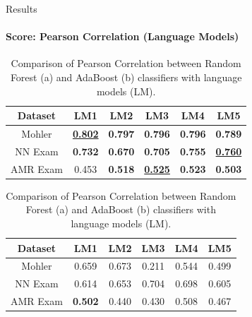 \documentclass[aspectratio=169]{beamer}
\begin{document}
\begin{frame}{Results}
\framesubtitle{Score: Pearson Correlation (Language Models)}
\noindent
\begin{table}
	\noindent
	\begin{subtable}[c]{0.7\textwidth}
		\noindent
		\centering
		\begin{tabular}{|c|c|c|c|c|c|}
			\hline
			Dataset & LM1 & LM2 & LM3 & LM4 & LM5 \\
			\hline
			Mohler &\underline{\textbf{0.802}}& \textbf{0.797}& \textbf{0.796}& \textbf{0.796}& \textbf{0.789}\\
			\hline
			NN Exam &\textbf{0.732}& \textbf{0.670}& \textbf{0.705}& \textbf{0.755}& \underline{\textbf{0.760}}\\
			\hline
			AMR Exam &0.453& \textbf{0.518}& \underline{\textbf{0.525}}& \textbf{0.523}& \textbf{0.503}\\
			\hline
		\end{tabular}
		\subcaption{}
	\end{subtable}
	\begin{subtable}[c]{0.7\textwidth}
		\centering
		\begin{tabular}{|c|c|c|c|c|c|}
			\hline
			Dataset & LM1 & LM2 & LM3 & LM4 & LM5 \\
			\hline
			Mohler &0.659& 0.673& 0.211& 0.544& 0.499 \\
			\hline
			NN Exam &0.614& 0.653& 0.704& 0.698& 0.605\\
			\hline
			AMR Exam &\textbf{0.502}& 0.440& 0.430& 0.508& 0.467\\
			\hline
		\end{tabular}	
		\subcaption{}
	\end{subtable}
	\caption{Comparison of Pearson Correlation between Random Forest (a) and AdaBoost (b) classifiers with language models (LM).}
\end{table}
\end{frame}
\end{document}
